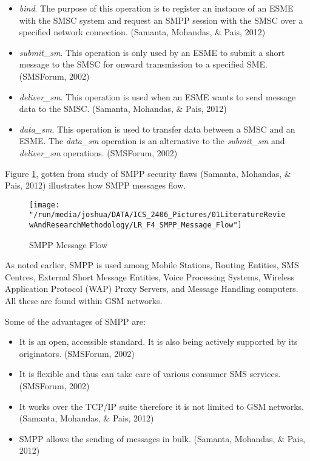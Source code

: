 \documentclass[12pt,svgnames,smaller]{article} %
\begin{document}
\begin{enumerate}
		\begin{itemize}
			\item \textit{bind}. The purpose of this operation is to register an instance of an ESME with the SMSC system and request an SMPP session with the SMSC over a specified network connection. (Samanta, Mohandas, \& Pais, 2012)
			\item \textit{submit\_sm}. This operation is only used by an ESME to submit a short message to the SMSC for onward transmission to a specified SME. (SMSForum, 2002) 
			\item \textit{deliver\_sm}. This operation is used when an ESME wants to send message data to the SMSC. (Samanta, Mohandas, \& Pais, 2012)
			\item \textit{data\_sm}. This operation is used to transfer data between a SMSC and an ESME. The \textit{data\_sm} operation is an alternative to the \textit{submit\_sm} and \textit{deliver\_sm} operations. (SMSForum, 2002)
		\end{itemize}
		
		Figure \ref{fig:LiteratureReview-Figure4}, gotten from study of SMPP security flaws (Samanta, Mohandas, \& Pais, 2012) illustrates how SMPP messages flow.
		
		\begin{figure}
			\centering
			\texttt{[image: "/run/media/joshua/DATA/ICS\_2406\_Pictures/01LiteratureReviewAndResearchMethodology/LR\_F4\_SMPP\_Message\_Flow"]}
			\caption{SMPP Message Flow}
			\label{fig:LiteratureReview-Figure4}
		\end{figure}
		
		As noted earlier, SMPP is used among Mobile Stations, Routing Entities, SMS Centres, External Short Message Entities, Voice Processing Systems, Wireless Application Protocol (WAP) Proxy Servers, and Message Handling computers. All these are found within GSM networks.	
		
		Some of the advantages of SMPP are:
		
		\begin{itemize}
			\item It is an open, accessible standard. It is also being actively supported by its originators. (SMSForum, 2002)
			\item It is flexible and thus can take care of various consumer SMS services. (SMSForum, 2002)
			\item It works over the TCP/IP suite therefore it is not limited to GSM networks. (Samanta, Mohandas, \& Pais, 2012)
			\item SMPP allows the sending of messages in bulk. (Samanta, Mohandas, \& Pais, 2012)
		\end{itemize}
		

\end{enumerate}
\end{document}
